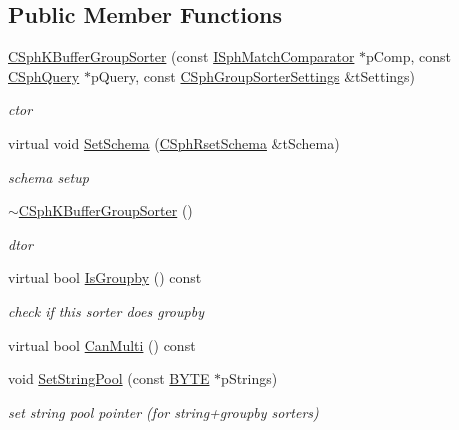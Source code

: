 \subsection*{Public Member Functions}
\begin{DoxyCompactItemize}
\item 
\hyperlink{classCSphKBufferGroupSorter_ae13b9603a97c7e02db5aceb1e2a6ba40}{C\-Sph\-K\-Buffer\-Group\-Sorter} (const \hyperlink{structISphMatchComparator}{I\-Sph\-Match\-Comparator} $\ast$p\-Comp, const \hyperlink{classCSphQuery}{C\-Sph\-Query} $\ast$p\-Query, const \hyperlink{structCSphGroupSorterSettings}{C\-Sph\-Group\-Sorter\-Settings} \&t\-Settings)
\begin{DoxyCompactList}\small\item\em ctor \end{DoxyCompactList}\item 
virtual void \hyperlink{classCSphKBufferGroupSorter_a3818360220142c139a61a4c0dec37a47}{Set\-Schema} (\hyperlink{classCSphRsetSchema}{C\-Sph\-Rset\-Schema} \&t\-Schema)
\begin{DoxyCompactList}\small\item\em schema setup \end{DoxyCompactList}\item 
\hyperlink{classCSphKBufferGroupSorter_a2425995c76b3495e617231cbd8393377}{$\sim$\-C\-Sph\-K\-Buffer\-Group\-Sorter} ()
\begin{DoxyCompactList}\small\item\em dtor \end{DoxyCompactList}\item 
virtual bool \hyperlink{classCSphKBufferGroupSorter_acda318e10e235640a396b0baa267e15b}{Is\-Groupby} () const 
\begin{DoxyCompactList}\small\item\em check if this sorter does groupby \end{DoxyCompactList}\item 
virtual bool \hyperlink{classCSphKBufferGroupSorter_a65ddfdf1bfe408aadec043fdde4dedba}{Can\-Multi} () const 
\item 
void \hyperlink{classCSphKBufferGroupSorter_a14bfa04c4f6f13d5b4ec76bd923cc0a9}{Set\-String\-Pool} (const \hyperlink{sphinxstd_8h_a4ae1dab0fb4b072a66584546209e7d58}{B\-Y\-T\-E} $\ast$p\-Strings)
\begin{DoxyCompactList}\small\item\em set string pool pointer (for string+groupby sorters) \end{DoxyCompactList}\item 

\end{DoxyCompactItemize}
